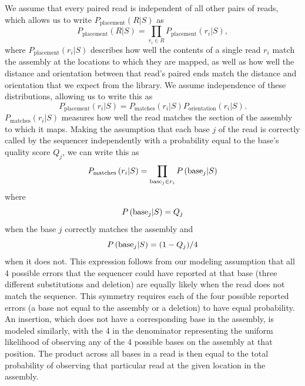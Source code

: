 \documentclass[phd,tocprelim]{cornell}
\begin{document}
We assume that every paired read is independent of all other pairs of reads, which allows us to write $P_{\text{placement}}(R|S)$ as
\begin{equation}
    P_{\text{placement}}(R|S) = \prod_{r_{i} \in R} P_{\text{placement}}\left(r_{i}|S\right),
\end{equation}
where $P_{\text{placement}}\left(r_{i}|S\right)$ describes how well the contents of a single read $r_{i}$ match the assembly at the locations to which they are mapped, as well as how well the distance and orientation between that read’s paired ends match the distance and orientation that we expect from the library.  We assume independence of these distributions, allowing us to write this as
\begin{equation}
    P_{\text{placement}}\left(r_{i}|S\right) = P_{\text{matches}}\left(r_{i}|S\right)P_{\text{orientation}}\left(r_{i}|S\right). 
\end{equation}
$P_{\text{matches}}\left(r_{i}|S\right)$ measures how well the read matches the section of the assembly to which it maps. Making the assumption that each base $j$ of the read is correctly called by the sequencer independently with a probability equal to the base’s quality score $Q_{j}$, we can write this as
\begin{equation}
    P_{\text{matches}}\left(r_{i}|S\right) = \prod_{{\rm base}_{j} \in r_{i}} P\left({\rm base}_{j}|S\right)
\end{equation}
where
\begin{equation}
    P\left({\rm base}_{j}|S\right) = Q_{j}
\end{equation}
when the base $j$ correctly matches the assembly and
\begin{equation}
    P\left({\rm base}_{j}|S\right) = (1-Q_{j})/4
\end{equation}
when it does not. This expression follows from our modeling assumption that all 4 possible errors that the sequencer could have reported at that base (three different substitutions and deletion) are equally likely when the read does not match the sequence. This symmetry requires each of the four possible reported errors (a base not equal to the assembly or a deletion) to have equal probability. An insertion, which does not have a corresponding base in the assembly, is modeled similarly, with the 4 in the denominator representing the uniform likelihood of observing any of the 4 possible bases on the assembly at that position. The product across all bases in a read is then equal to the total probability of observing that particular read at the given location in the assembly.
\end{document}
